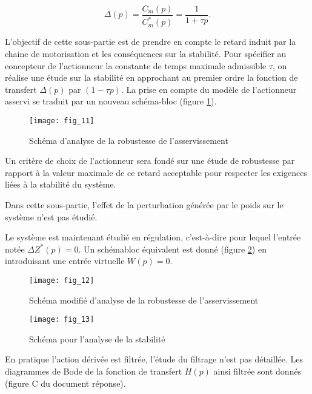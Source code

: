 $$
\Delta(p)=\frac{C_{m}(p)}{C_{m}^{*}(p)}=\frac{1}{1+\tau p} .
$$

L'objectif de cette sous-partie est de prendre en compte le retard induit par la chaine de motorisation et les conséquences sur la stabilité. Pour spécifier au concepteur de l'actionneur la constante de temps maximale admissible $\tau$, on réalise une étude sur la stabilité en approchant au premier ordre la fonction de transfert $\Delta(p)$ par $(1-\tau p)$. La prise en compte du modèle de l'actionneur asservi se traduit par un nouveau schéma-bloc (figure \ref{fig:11}).


\begin{figure}[H]
\centering
\texttt{[image: fig\_11]}
\caption{\label{fig:11} Schéma d'analyse de la robustesse de l'asservissement}
\end{figure}


Un critère de choix de l'actionneur sera fondé sur une étude de robustesse par rapport à la valeur maximale de ce retard acceptable pour respecter les exigences liées à la stabilité du système.

Dans cette sous-partie, l'effet de la perturbation générée par le poids sur le système n'est pas étudié.

Le système est maintenant étudié en régulation, c'est-à-dire pour lequel l'entrée notée $\Delta Z^{*}(p)=0$. Un schémabloc équivalent est donné (figure \ref{fig:12}) en introduisant une entrée virtuelle $W(p)=0$.

\begin{figure}[H]
\centering
\texttt{[image: fig\_12]}
\caption{\label{fig:12} Schéma modifié d'analyse de la robustesse de l'asservissement}
\end{figure}



\ifprof
\begin{corrige}
\end{corrige}
\else
\fi

\begin{figure}[H]
\centering
\texttt{[image: fig\_13]}
\caption{\label{fig:13} Schéma pour l'analyse de la stabilité}
\end{figure}

En pratique l'action dérivée est filtrée, l'étude du filtrage n'est pas détaillée. Les diagrammes de Bode de la fonction de transfert $H(p)$ ainsi filtrée sont donnés (figure $\mathrm{C}$ du document réponse). 


